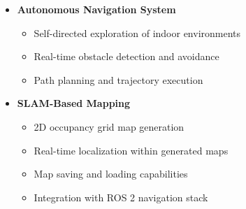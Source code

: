\begin{itemize}
    \item \textbf{Autonomous Navigation System}
    \begin{itemize}
        \item Self-directed exploration of indoor environments
        \item Real-time obstacle detection and avoidance
        \item Path planning and trajectory execution
    \end{itemize}

    \item \textbf{SLAM-Based Mapping}
    \begin{itemize}
        \item 2D occupancy grid map generation
        \item Real-time localization within generated maps
        \item Map saving and loading capabilities
        \item Integration with ROS 2 navigation stack
    \end{itemize}


\end{itemize}
